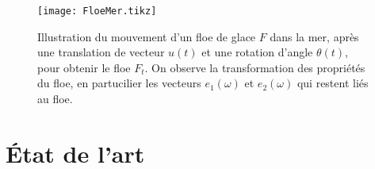 \begin{figure}
    \centering
    \texttt{[image: FloeMer.tikz]}
    \caption{Illustration du mouvement d'un floe de glace $F$ dans la mer, après une translation de vecteur $u(t)$ et une rotation d'angle $\theta(t)$, pour obtenir le floe $F_t$. On observe la transformation des propriétés du floe, en partucilier les vecteurs $e_1(\omega)$ et $e_2(\omega)$ qui restent liés au floe.}
\end{figure}


\section{État de l'art}
